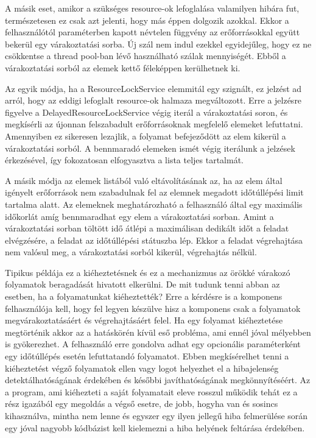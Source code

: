A másik eset, amikor a szükséges resource-ok lefoglalása valamilyen hibára fut, természetesen ez csak azt jelenti, hogy más éppen dolgozik azokkal. Ekkor a felhasználótól paraméterben kapott névtelen függvény az erőforrásokkal együtt bekerül egy várakoztatási sorba. Új szál nem indul ezekkel egyidejűleg, hogy ez ne csökkentse a thread pool-ban lévő használható szálak mennyiségét. Ebből a várakoztatási sorból az elemek kettő féleképpen kerülhetnek ki.

Az egyik módja, ha a ResourceLockService elemmitál egy szignált, ez jelzést ad arról, hogy az eddigi lefoglalt resource-ok halmaza megváltozott. Erre a jelzésre figyelve a DelayedResourceLockService végig iterál a várakoztatási soron, és megkísérli az újonnan felszabadult erőforrásoknak megfelelő elemeket lefuttatni. Amennyiben ez sikeresen lezajlik, a folyamat befejeződött az elem kikerül a várakoztatási sorból. A bennmaradó elemeken ismét végig iterálunk a jelzések érkezésével, így fokozatosan elfogyasztva a lista teljes tartalmát.

A másik módja az elemek listából való eltávolításának az, ha az elem által igényelt erőforrások nem szabadulnak fel az elemnek megadott időtúllépési limit tartalma alatt. Az elemeknek meghatározható a felhasználó által egy maximális időkorlát amíg bennmaradhat egy elem a várakoztatási sorban. Amint a várakoztatási sorban töltött idő átlépi a maximálisan dedikált időt a feladat elvégzésére, a feladat az időtúllépési státuszba lép. Ekkor a feladat végrehajtása nem valósul meg, a várakoztatási sorból kikerül, végrehajtás nélkül.

Tipikus példája ez a kiéheztetésnek és ez a mechanizmus az örökké várakozó folyamatok beragadását hivatott elkerülni. De mit tudunk tenni abban az esetben, ha a folyamatunkat kiéheztették? Erre a kérdésre is a komponens felhasználója kell, hogy fel legyen készülve hisz a komponens csak a folyamatok megvárakoztatásáért és végrehajtásáért felel. Ha egy folyamat kiéheztetése megtörténik akkor az a hatáskörén kívül eső probléma, ami ennél jóval mélyebben is gyökerezhet. A felhasználó erre gondolva adhat egy opcionális paraméterként egy időtúllépés esetén lefuttatandó folyamatot. Ebben megkísérelhet tenni a kiéheztetést végző folyamatok ellen vagy logot helyezhet el a hibajelenség detektálhatóságának érdekében és későbbi javíthatóságának megkönnyítéséért. Az a program, ami kiéhezteti a saját folyamatait eleve rosszul működik tehát ez a rész igazából egy megoldás a végső esetre, de jobb, hogyha van és sosincs kihasználva, mintha nem lenne és egyszer egy ilyen jellegű hiba felmerülése során egy jóval nagyobb kódbázist kell kielemezni a hiba helyének feltárása érdekében.

